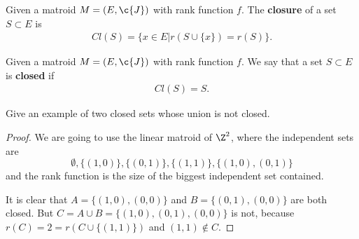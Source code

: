 \begin{definition}[Closure]
    Given a matroid $M=(E,\c{J})$ with rank function $f$. The \textbf{closure} of a set $S \subset E$
    is
    \begin{align}
        Cl(S) = \{ x \in E | r(S \cup \{ x \} ) = r(S)\}.
    \end{align}    
\end{definition}

\begin{definition}
    Given a matroid $M=(E,\c{J})$ with rank function $f$. We say that a set $S \subset E$ is \textbf{closed}
    if
    \begin{align}
        Cl(S) = S.
    \end{align}
\end{definition}

\prob
{
    Give an example of two closed sets whose union is not closed.
}

\begin{proof}
    We are going to use the linear matroid of $\Z^2$, where the independent sets are 
    $$\emptyset, \{(1, 0)\}, \{(0, 1)\}, \{(1, 1)\}, \{(1, 0), (0, 1)\}$$
    and the rank function is the size of the biggest independent set contained.\pn
    
    It is clear that $A = \{(1, 0), (0, 0)\}$ and $B = \{(0, 1), (0, 0)\}$ are both closed.
    But $C = A \cup B = \{(1, 0), (0, 1), (0, 0)\}$ is not, because $r(C) = 2 = r(C \cup \{ (1, 1) \})$ and
    $(1, 1) \not\in C$.
\end{proof}